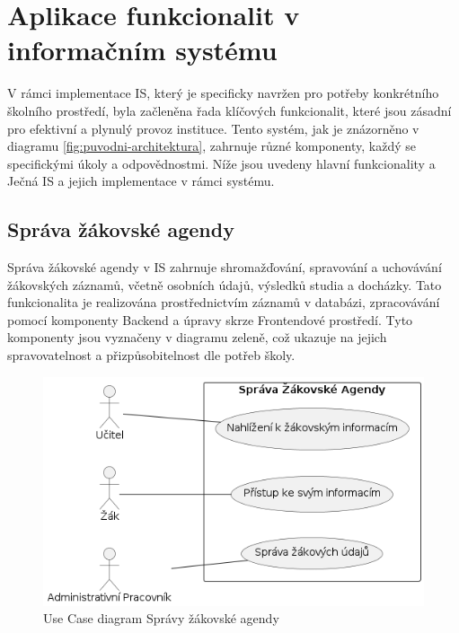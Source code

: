 \documentclass[FM,Proj]{tulthesis}
\begin{document}


\section{Aplikace funkcionalit v informačním systému}
V rámci implementace IS, který je specificky navržen pro potřeby konkrétního školního prostředí,
byla začleněna řada klíčových funkcionalit, které jsou zásadní pro efektivní a plynulý provoz
instituce. Tento systém, jak je znázorněno v diagramu \ref{fig:puvodni-architektura},
zahrnuje různé komponenty, každý se specifickými úkoly a odpovědnostmi. Níže jsou uvedeny
hlavní funkcionality a Ječná IS a jejich implementace v rámci systému.

\subsection*{Správa žákovské agendy}
Správa žákovské agendy v IS zahrnuje shromažďování, spravování a uchovávání žákovských
záznamů, včetně osobních údajů, výsledků studia a docházky. Tato funkcionalita je realizována
prostřednictvím záznamů v databázi, zpracovávání pomocí komponenty Backend a úpravy skrze
Frontendové prostředí. Tyto komponenty jsou vyznačeny v diagramu zeleně, což ukazuje na jejich
spravovatelnost a přizpůsobitelnost dle potřeb školy.

\begin{figure}[H]
    \includegraphics[width=\textwidth-28pt]{uc-sprava-zakovske-agendy.png}
    \caption{Use Case diagram Správy žákovské agendy}
    \label{fig:uc-sprava-zakovske-agendy}
\end{figure}
\end{document}
